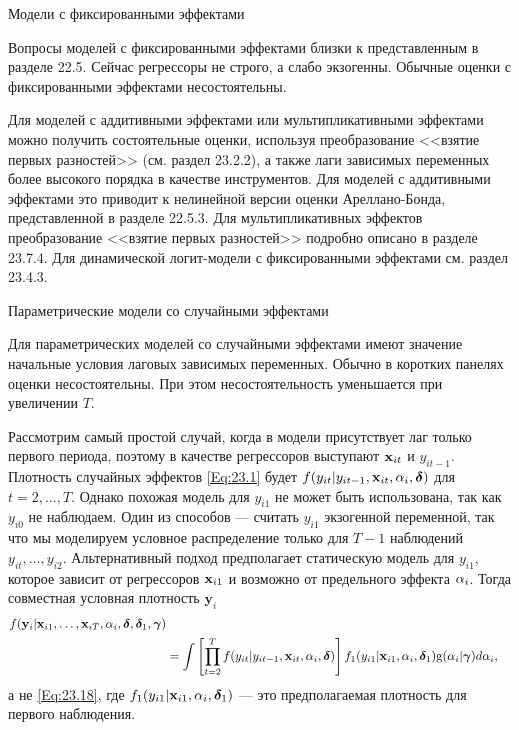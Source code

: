 {\centering Модели с фиксированными эффектами \\}

Вопросы моделей с фиксированными эффектами близки к представленным в разделе 22.5. Сейчас регрессоры не строго, а слабо экзогенны. Обычные оценки с фиксированными эффектами несостоятельны.

Для моделей с аддитивными эффектами или мультипликативными эффектами можно получить состоятельные оценки, используя преобразование <<взятие первых разностей>> (см. раздел 23.2.2), а также лаги зависимых переменных более высокого порядка в качестве инструментов. Для моделей с аддитивными эффектами это приводит к нелинейной версии оценки Ареллано-Бонда, представленной в разделе 22.5.3. Для мультипликативных эффектов преобразование <<взятие первых разностей>> подробно описано в разделе 23.7.4. Для  динамической логит-модели с фиксированными эффектами см. раздел 23.4.3.

{\centering Параметрические модели со случайными эффектами \\}

Для параметрических моделей со случайными эффектами имеют значение начальные условия лаговых зависимых переменных. Обычно в коротких панелях оценки несостоятельны. При этом несостоятельность уменьшается при увеличении $T$.

Рассмотрим самый простой случай, когда в модели присутствует лаг только первого периода, поэтому в качестве регрессоров выступают $\mathbf{x}_{it}$ и $y_{it-1}$. Плотность случайных эффектов \ref{Eq:23.1} будет $f(y_{it}|y_{it-1}, \mathbf{x}_{it}, \alpha_i, \bm\delta)$ для $t=2, \dots, T$. Однако похожая модель для $y_{i1}$ не может быть использована, так как $y_{i0}$ не наблюдаем. Один из способов --- считать $y_{i1}$ экзогенной переменной, так что мы моделируем условное распределение только для $T-1$ наблюдений $y_{it}, \dots, y_{i2}$. Альтернативный подход предполагает статическую модель для $y_{i1}$, которое зависит от регрессоров $\mathbf{x}_{i1}$ и возможно от предельного эффекта $\alpha_i$. Тогда совместная условная плотность $\mathbf{y}_i$ 
\begin{align}
f(\mathbf{y}_i|\mathbf{x}_{i1}, \dots, \mathbf{x}_{iT}, \alpha_i, \bm\delta, \bm\delta_1, \bm\gamma) \nonumber \\
& =\int \left[ \prod^T_{t=2} f(y_{it}|y_{it-1}, \mathbf{x}_{it}, \alpha_i, \bm\delta) \right] f_1(y_{i1}|\mathbf{x}_{i1}, \alpha_i, \bm\delta_1) \mathrm g(\alpha_i|\bm\gamma) d \alpha_i,
\nonumber
\end{align}
а не \ref{Eq:23.18}, где $f_1(y_{i1}|\mathbf{x}_{i1}, \alpha_i, \bm\delta_1)$ --- это предполагаемая плотность для первого наблюдения.

